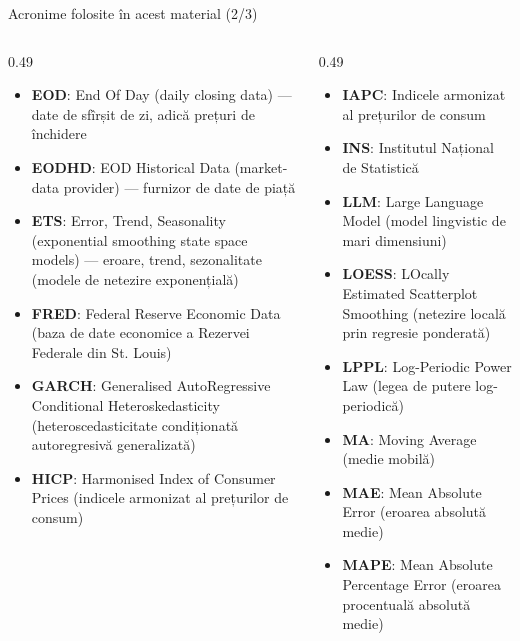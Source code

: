\begin{frame}{Acronime folosite în acest material (2/3)}
\begin{columns}[T]
\begin{column}{0.49\textwidth}
\begin{itemize}\setlength{\itemsep}{0pt}
    \item \textbf{EOD}: End Of Day (daily closing data) — date de sfîrșit de zi, adică prețuri de închidere
    \item \textbf{EODHD}: EOD Historical Data (market-data provider) — furnizor de date de piață
    \item \textbf{ETS}: Error, Trend, Seasonality (exponential smoothing state space models) — eroare, trend, sezonalitate (modele de netezire exponențială)
    \item \textbf{FRED}: Federal Reserve Economic Data (baza de date economice a Rezervei Federale din St. Louis)
    \item \textbf{GARCH}: Generalised AutoRegressive Conditional Heteroskedasticity (heteroscedasticitate condiționată autoregresivă generalizată)
    \item \textbf{HICP}: Harmonised Index of Consumer Prices (indicele armonizat al prețurilor de consum)
\end{itemize}
\end{column}
\begin{column}{0.49\textwidth}
\begin{itemize}\setlength{\itemsep}{0pt}
    \item \textbf{IAPC}: Indicele armonizat al prețurilor de consum
    \item \textbf{INS}: Institutul Național de Statistică
    \item \textbf{LLM}: Large Language Model (model lingvistic de mari dimensiuni)
    \item \textbf{LOESS}: LOcally Estimated Scatterplot Smoothing (netezire locală prin regresie ponderată)
    \item \textbf{LPPL}: Log-Periodic Power Law (legea de putere log-periodică)
    \item \textbf{MA}: Moving Average (medie mobilă)
    \item \textbf{MAE}: Mean Absolute Error (eroarea absolută medie)
    \item \textbf{MAPE}: Mean Absolute Percentage Error (eroarea procentuală absolută medie)
\end{itemize}
\end{column}
\end{columns}
\end{frame}
